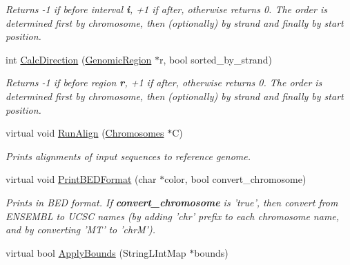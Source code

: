 \begin{DoxyCompactItemize}
\begin{DoxyCompactList}\small\item\em Returns -\/1 if before interval {\bfseries i}, +1 if after, otherwise returns 0. The order is determined first by chromosome, then (optionally) by strand and finally by start position. \end{DoxyCompactList}\item 
\hypertarget{classGenomicRegion_ab44366e44dc9a83da65b9593ce90dd32}{
int \hyperlink{classGenomicRegion_ab44366e44dc9a83da65b9593ce90dd32}{CalcDirection} (\hyperlink{classGenomicRegion}{GenomicRegion} $\ast$r, bool sorted\_\-by\_\-strand)}
\label{classGenomicRegion_ab44366e44dc9a83da65b9593ce90dd32}

\begin{DoxyCompactList}\small\item\em Returns -\/1 if before region {\bfseries r}, +1 if after, otherwise returns 0. The order is determined first by chromosome, then (optionally) by strand and finally by start position. \end{DoxyCompactList}\item 
\hypertarget{classGenomicRegion_a90b0382a60f0a8532af73fc18f41364b}{
virtual void \hyperlink{classGenomicRegion_a90b0382a60f0a8532af73fc18f41364b}{RunAlign} (\hyperlink{classChromosomes}{Chromosomes} $\ast$C)}
\label{classGenomicRegion_a90b0382a60f0a8532af73fc18f41364b}

\begin{DoxyCompactList}\small\item\em Prints alignments of input sequences to reference genome. \end{DoxyCompactList}\item 
\hypertarget{classGenomicRegion_a405010d9256a3c08c53adee98133cb62}{
virtual void \hyperlink{classGenomicRegion_a405010d9256a3c08c53adee98133cb62}{PrintBEDFormat} (char $\ast$color, bool convert\_\-chromosome)}
\label{classGenomicRegion_a405010d9256a3c08c53adee98133cb62}

\begin{DoxyCompactList}\small\item\em Prints in BED format. If {\bfseries convert\_\-chromosome} is 'true', then convert from ENSEMBL to UCSC names (by adding 'chr' prefix to each chromosome name, and by converting 'MT' to 'chrM'). \end{DoxyCompactList}\item 
\hypertarget{classGenomicRegion_a11b494e59775ac255ddb469c98f8a8a8}{
virtual bool \hyperlink{classGenomicRegion_a11b494e59775ac255ddb469c98f8a8a8}{ApplyBounds} (StringLIntMap $\ast$bounds)}
\label{classGenomicRegion_a11b494e59775ac255ddb469c98f8a8a8}


\end{DoxyCompactItemize}
